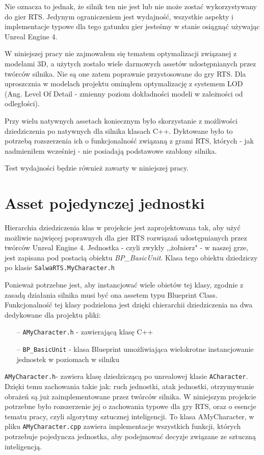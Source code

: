 \documentclass[12pt]{report}
\begin{document}
Nie oznacza to jednak, że silnik ten nie jest lub nie może zostać wykorzystywany do gier RTS. Jedynym ograniczeniem jest wydajność, wszystkie aspekty i implementacje typowe dla tego gatunku gier jesteśmy w stanie osiągnąć używając Unreal Engine 4. 

W niniejszej pracy nie zajmowałem się tematem optymalizacji związanej z modelami 3D, a użytych zostało wiele darmowych assetów udostępnianych przez twórców silnika. Nie są one zatem poprawnie przystosowane do gry RTS. Dla uproszcznia w modelach projektu ominąłem optymalizację z systemem LOD (Ang. Level Of Detail - zmienny poziom dokładności modeli w zależności od odległości). 

Przy wielu natywnych assetach koniecznym było skorzystanie z możliwości dziedziczenia po natywnych dla silnika klasach C++. Dyktowane było to potrzebą rozszerzenia ich o funkcjonalność związaną z grami RTS, których - jak nadmieniłem wcześniej - nie posiadają podstawowe szablony silnika.


Test wydajności będzie również zawarty w niniejszej pracy.

\section{Asset pojedynczej jednostki}

Hierarchia dziedziczenia klas w projekcie jest zaprojektowana tak, aby użyć możliwie najwięcej poprawnych dla gier RTS rozwiązań udostępnianych przez twórców Unreal Engine 4. Jednostka - czyli zwykły ,,żołnierz" - w naszej grze, jest zapisana pod postacią obiektu \textit{BP\_BasicUnit}. Klasa tego obiektu dziedziczy po klasie \texttt{SalwaRTS.MyCharacter.h}

Ponieważ potrzebne jest, aby instancjować wiele obietów tej klasy, zgodnie z zasadą działania silnika musi być ona assetem typu Blueprint Class. Funkcjonalność tej klasy podzielona jest dzięki chierarchii dziedziczenia na dwa dedykowane dla projektu pliki: 
\begin{itemize}
\item[--] \texttt{AMyCharacter.h} - zawierającą klasę C++
\item[--] \texttt{\texttt{BP\_BasicUnit}} - klasa Blueprint umożliwiająca wielokrotne instancjowanie jednostek w poziomach w silniku
\end{itemize}

\texttt{AMyCharacter.h}- zawiera klasę dziedziczącą po unrealowej klasie \texttt{ACharacter}. Dzięki temu zachowania takie jak: ruch jednostki, atak jednostki, otrzymywanie obrażeń są już zaimplementowane przez twórców silnika. W niniejszym projekcie potrzebne było rozszerzenie jej o zachowania typowe dla gry RTS, oraz o esencje tematu pracy, czyli algorytmy sztucznej inteligencji. To klasa AMyCharacter, w pliku \texttt{AMyCharacter.cpp} zawiera implementacje wszystkich funkcji, których potrzebuje pojedyncza jednostka, aby podejmować decyzje związane ze sztuczną inteligencją.
\end{document}
